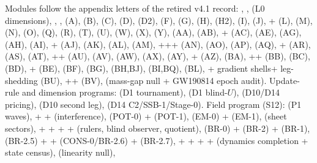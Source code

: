 \documentclass[11pt]{article}
\begin{document}
{\sloppy\footnotesize
Modules follow the appendix letters of the retired v4.1 record:
, ,  (L0 dimensions), , ,
 (A),  (B),  (C),
 (D),  (D2),  (F),  (G),
 (H),  (H2),  (I),  (J),
+ (L),  (M),  (N),
 (O),  (Q),  (R),  (T),
 (U),  (W),  (X),
 (Y),  (AA),  (AB),
+ (AC),  (AE),
 (AG),  (AH),  (AI),
+ (AJ),  (AK),
 (AL),  (AM),
+++ (AN),
 (AO),  (AP),  (AQ),
+ (AR),  (AS),
 (AT), ++ (AU),
 (AV),  (AW),  (AX),
 (AY), + (AZ),
 (BA), ++ (BB),
 (BC),  (BD), + (BE),
 (BF),  (BG),  (BH,BJ),
 (BI,BQ),  (BL),
+ gradient shells+ leg-shedding (BU),
++ (BV),
 (mass-gap null + GW190814 epoch audit).
Update-rule and dimension programs:  (D1 tournament),
 (D1 blind-$U$),  (D10/D14 pricing),
 (D10 second leg),  (D14 C2/SSB-1/Stage-0).
Field program (S12):  (P1 waves),  +
 +  (interference),  (POT-0) +
 (POT-1),  (EM-0) + 
(EM-1),  (sheet sectors),  +  +
 +  +  (rulers, blind observer,
quotient),  (BR-0) +  (BR-2) +
 (BR-1),  (BR-2.5) +  +
 (CONS-0/BR-2.6) +  (BR-2.7),
 +  +  +  + 
(dynamics completion + state census),  (linearity null),
}
\end{document}
